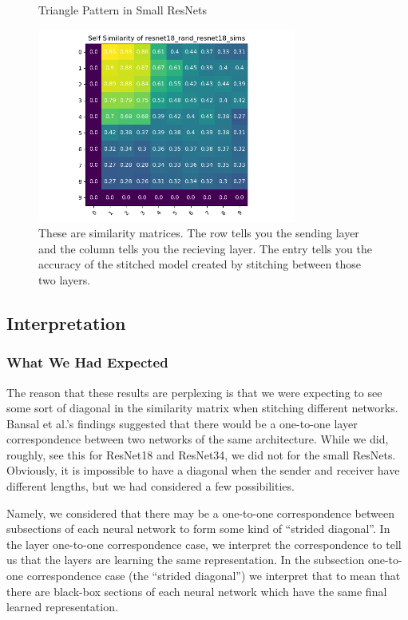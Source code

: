 \documentclass{article} %
\begin{document}
\begin{center}
   \begin{figure}[h!]
      \centering
      \caption{Triangle Pattern in Small ResNets}
      \includegraphics[width=8.5cm]{resnet18_rand_resnet18_sims.png}
      \caption*{These are similarity matrices. The row tells you the sending layer and the column tells you the recieving layer.
      The entry tells you the accuracy of the stitched model created by stitching between those two layers.}
   \end{figure}
\end{center}

\subsection*{Interpretation}
\subsubsection*{What We Had Expected}
The reason that these results are perplexing is that we were expecting to see some sort of diagonal in the similarity matrix
when stitching
different networks. Bansal et al.'s findings suggested that there would be a one-to-one layer correspondence between
two networks of the same architecture. While we did, roughly, see this for ResNet18 and ResNet34, we did not for the
small ResNets. Obviously, it is impossible to have a diagonal when the sender and receiver have different lengths,
but we had considered a few possibilities.

Namely, we considered that there may be a one-to-one correspondence between subsections of each neural network to
form some kind of ``strided diagonal''. In the layer one-to-one correspondence case, we interpret the correspondence
to tell us that the layers are learning the same representation. In the subsection one-to-one correspondence case
(the ``strided diagonal'') we interpret that to mean that there are black-box sections of each neural network which
have the same final learned representation.
\end{document}
